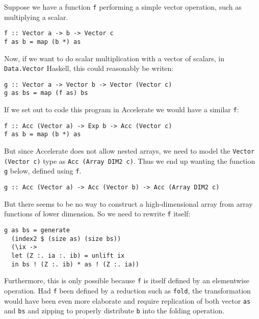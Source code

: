 Suppose we have a function \texttt{f} performing a simple vector operation,
such as multiplying a scalar.

\begin{verbatim}
f :: Vector a -> b -> Vector c
f as b = map (b *) as
\end{verbatim}

Now, if we want to do scalar multiplication with a vector of scalars, in
\texttt{Data.Vector} Haskell, this could reasonably be writen:

\begin{verbatim}
g :: Vector a -> Vector b -> Vector (Vector c)
g as bs = map (f as) bs
\end{verbatim}

If we set out to code this program in Accelerate we would have a similar
\texttt{f}:

\begin{verbatim}
f :: Acc (Vector a) -> Exp b -> Acc (Vector c)
f as b = map (b *) as
\end{verbatim}

But since Accelerate does not allow nested arrays, we need to model the
\texttt{Vector (Vector c)} type  as \texttt{Acc (Array DIM2 c)}. Thus we end up
wanting the function \texttt{g} below, defined using \texttt{f}.

\begin{verbatim}
g :: Acc (Vector a) -> Acc (Vector b) -> Acc (Array DIM2 c)
\end{verbatim}

But there seems to be no way to construct a high-dimensional array from array
functions of lower dimension. So we need to rewrite \texttt{f} itself:

\begin{verbatim}
g as bs = generate
  (index2 $ (size as) (size bs))
  (\ix ->
  let (Z :. ia :. ib) = unlift ix
  in bs ! (Z :. ib) * as ! (Z :. ia))
\end{verbatim}

Furthermore, this is only possible because \texttt{f} is itself defined by an
elementwise operation. Had \texttt{f} been defined by a reduction such as
\texttt{fold}, the transformation would have been even more elaborate and
require replication of both vector \texttt{as} and \texttt{bs} and zipping to
properly distribute \texttt{b} into the folding operation.


